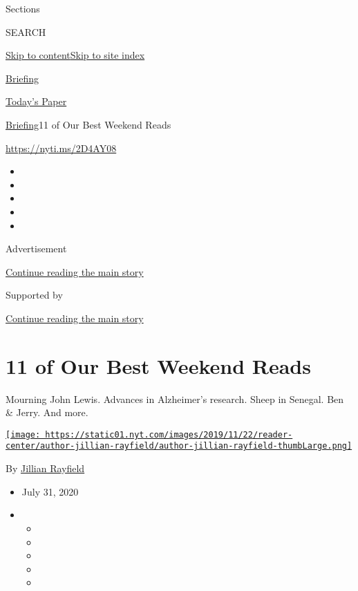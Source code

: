 Sections

SEARCH

\protect\hyperlink{site-content}{Skip to
content}\protect\hyperlink{site-index}{Skip to site index}

\href{https://www.nytimes.com/interactive/2018/briefing/global-morning-briefing-newsletter-signup.html}{Briefing}

\href{https://myaccount.nytimes.com/auth/login?response_type=cookie\&client_id=vi}{}

\href{https://www.nytimes.com/section/todayspaper}{Today's Paper}

\href{/interactive/2018/briefing/global-morning-briefing-newsletter-signup.html}{Briefing}\textbar{}11
of Our Best Weekend Reads

\url{https://nyti.ms/2D4AY08}

\begin{itemize}
\item
\item
\item
\item
\item
\end{itemize}

Advertisement

\protect\hyperlink{after-top}{Continue reading the main story}

Supported by

\protect\hyperlink{after-sponsor}{Continue reading the main story}

\hypertarget{11-of-our-best-weekend-reads}{%
\section{11 of Our Best Weekend
Reads}\label{11-of-our-best-weekend-reads}}

Mourning John Lewis. Advances in Alzheimer's research. Sheep in Senegal.
Ben \& Jerry. And more.

\href{https://www.nytimes.com/by/jillian-rayfield}{\texttt{[image: https://static01.nyt.com/images/2019/11/22/reader-center/author-jillian-rayfield/author-jillian-rayfield-thumbLarge.png]}}

By \href{https://www.nytimes.com/by/jillian-rayfield}{Jillian Rayfield}

\begin{itemize}
\item
  July 31, 2020
\item
  \begin{itemize}
  \item
  \item
  \item
  \item
  \item
  \end{itemize}
\end{itemize}

